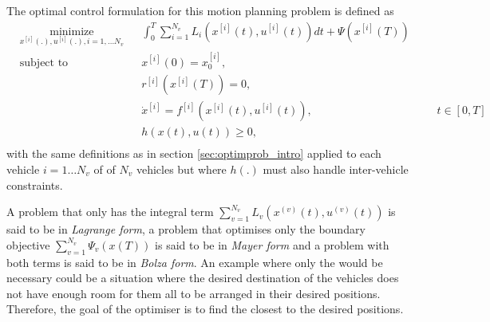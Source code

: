 \par The optimal control formulation for this motion planning problem is defined as
\begin{equation}
    \label{eq:multi_cost}
    \begin{aligned}
    & \underset{x^{[i]}(.),u^{[i]}(.),i= 1,\dots N_v}{\text{minimize}} && \int_0^T \sum_{i=1}^{N_v}  L_i (x^{[i]}(t),u^{[i]}(t))dt + \Psi (x^{[i]}(T)) \\
    & \text{subject to}  && x^{[i]}(0) = x_0^{[i]}, \\
        & && r^{[i]}(x^{[i]}(T)) = 0, \\
        & && \dot{x}^{[i]} = f^{[i]} (x^{[i]}(t), u^{[i]}(t)), &&& t \in [0,T]\\
        & && h(x(t),u(t)) \geq 0, \\
    \end{aligned}
\end{equation}
with the same definitions as in section \ref{sec:optimprob_intro} applied to each vehicle $i=1\dots N_v$ of of $N_v$ vehicles but where $h(.)$ must also handle inter-vehicle constraints.
\par A problem that only has the integral term $\sum_{v=1}^{N_v} L_v(x^{(v)}(t),u^{(v)}(t))$ is said to be in \textit{Lagrange form}, a problem that optimises only the boundary objective $\sum_{v=1}^{N_v} \Psi_v(x(T))$ is said to be in \textit{Mayer form} and a problem with both terms is said to be in \textit{Bolza form}. An example where only the  would be necessary could be a situation where the desired destination of the vehicles does not have enough room for them all to be arranged in their desired positions. Therefore, the goal of the optimiser is to find the closest to the desired positions.

